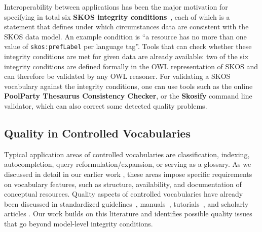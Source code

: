 


Interoperability between applications has been the major motivation for specifying in total six \textbf{SKOS integrity conditions}~\cite{SkosReference2008}, each of which is a statement that defines under which circumstances data are consistent with the SKOS data model. An example condition is ``a resource has no more than one value of \texttt{skos:prefLabel} per language tag''. Tools that can check whether these integrity conditions are met for given data are already available: two of the six integrity conditions are defined formally in the OWL representation of SKOS and can therefore be validated by any OWL reasoner. For validating a SKOS vocabulary against the integrity conditions, one can use tools such as the online \textbf{PoolParty Thesaurus Consistency Checker}, or the \textbf{Skosify} command line validator, which can also correct some detected quality problems.

\subsection{Quality in Controlled Vocabularies}

Typical application areas of controlled vocabularies are classification, indexing, autocompletion, query reformulation/expansion, or serving as a glossary. As we discussed in detail in our earlier work \cite{Nagy2011}, these areas impose specific requirements on vocabulary features, such as structure, availability, and documentation of conceptual resources. Quality aspects of controlled vocabularies have already been discussed in standardized guidelines~\cite{ISO25964-1:2011,Z39.19:2005}, manuals~\cite{Svenonius2003,Hedden2010,Aitchison2000,Harpring2010}, tutorials~\cite{Soergel2002}, and scholarly articles \cite{Coronado2009,Soergel1997,Elkin2002,Kless2010}. Our work builds on this literature and identifies possible quality issues that go beyond model-level integrity conditions.

